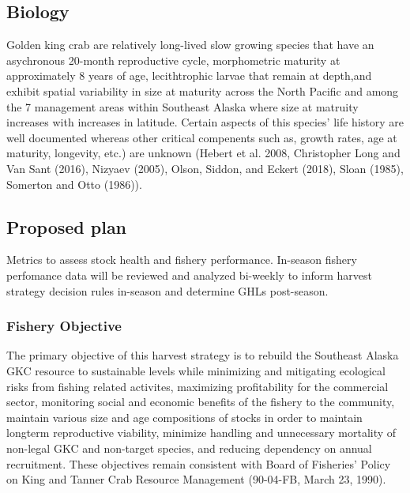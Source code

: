 \documentclass[]{article}
\begin{document}
\subsection*{Biology}\label{biology}

Golden king crab are relatively long-lived slow growing species that
have an asychronous 20-month reproductive cycle, morphometric maturity
at approximately 8 years of age, lecithtrophic larvae that remain at
depth,and exhibit spatial variability in size at maturity across the
North Pacific and among the 7 management areas within Southeast Alaska
where size at matruity increases with increases in latitude. Certain
aspects of this species' life history are well documented whereas other
critical compenents such as, growth rates, age at maturity, longevity,
etc.) are unknown (Hebert et al. 2008, Christopher Long and Van Sant
(2016), Nizyaev (2005), Olson, Siddon, and Eckert (2018), Sloan (1985),
Somerton and Otto (1986)).

\subsection*{Proposed plan}\label{proposed-plan}

Metrics to assess stock health and fishery performance. In-season
fishery perfomance data will be reviewed and analyzed bi-weekly to
inform harvest strategy decision rules in-season and determine GHLs
post-season.

\subsubsection*{Fishery Objective}\label{fishery-objective}

The primary objective of this harvest strategy is to rebuild the
Southeast Alaska GKC resource to sustainable levels while minimizing and
mitigating ecological risks from fishing related activites, maximizing
profitability for the commercial sector, monitoring social and economic
benefits of the fishery to the community, maintain various size and age
compositions of stocks in order to maintain longterm reproductive
viability, minimize handling and unnecessary mortality of non-legal GKC
and non-target species, and reducing dependency on annual recruitment.
These objectives remain consistent with Board of Fisheries' Policy on
King and Tanner Crab Resource Management (90-04-FB, March 23, 1990).
\end{document}
